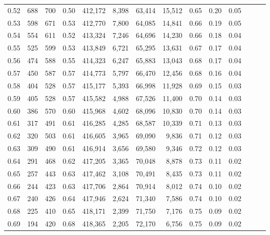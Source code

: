 \begin{tabular}{rrrrrrrrrrrrrr}
0.52 &     688 &    700 &  0.50 &  412,172 &    8,398 &  63,414 &  15,512 &  0.65 &  0.20 &      0.05 \\
0.53 &     598 &    671 &  0.53 &  412,770 &    7,800 &  64,085 &  14,841 &  0.66 &  0.19 &      0.05 \\
0.54 &     554 &    611 &  0.52 &  413,324 &    7,246 &  64,696 &  14,230 &  0.66 &  0.18 &      0.04 \\
0.55 &     525 &    599 &  0.53 &  413,849 &    6,721 &  65,295 &  13,631 &  0.67 &  0.17 &      0.04 \\
0.56 &     474 &    588 &  0.55 &  414,323 &    6,247 &  65,883 &  13,043 &  0.68 &  0.17 &      0.04 \\
0.57 &     450 &    587 &  0.57 &  414,773 &    5,797 &  66,470 &  12,456 &  0.68 &  0.16 &      0.04 \\
0.58 &     404 &    528 &  0.57 &  415,177 &    5,393 &  66,998 &  11,928 &  0.69 &  0.15 &      0.03 \\
0.59 &     405 &    528 &  0.57 &  415,582 &    4,988 &  67,526 &  11,400 &  0.70 &  0.14 &      0.03 \\
0.60 &     386 &    570 &  0.60 &  415,968 &    4,602 &  68,096 &  10,830 &  0.70 &  0.14 &      0.03 \\
0.61 &     317 &    491 &  0.61 &  416,285 &    4,285 &  68,587 &  10,339 &  0.71 &  0.13 &      0.03 \\
0.62 &     320 &    503 &  0.61 &  416,605 &    3,965 &  69,090 &   9,836 &  0.71 &  0.12 &      0.03 \\
0.63 &     309 &    490 &  0.61 &  416,914 &    3,656 &  69,580 &   9,346 &  0.72 &  0.12 &      0.03 \\
0.64 &     291 &    468 &  0.62 &  417,205 &    3,365 &  70,048 &   8,878 &  0.73 &  0.11 &      0.02 \\
0.65 &     257 &    443 &  0.63 &  417,462 &    3,108 &  70,491 &   8,435 &  0.73 &  0.11 &      0.02 \\
0.66 &     244 &    423 &  0.63 &  417,706 &    2,864 &  70,914 &   8,012 &  0.74 &  0.10 &      0.02 \\
0.67 &     240 &    426 &  0.64 &  417,946 &    2,624 &  71,340 &   7,586 &  0.74 &  0.10 &      0.02 \\
0.68 &     225 &    410 &  0.65 &  418,171 &    2,399 &  71,750 &   7,176 &  0.75 &  0.09 &      0.02 \\
0.69 &     194 &    420 &  0.68 &  418,365 &    2,205 &  72,170 &   6,756 &  0.75 &  0.09 &      0.02 \\

\end{tabular}
